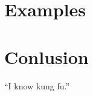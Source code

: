 \documentclass[adraft, copyright,creativecommons,sharealike,noncommercial]{eptcs}
\begin{document}
\section{Examples}

\section{Conlusion}

``I know kung fu.''	
\end{document}
